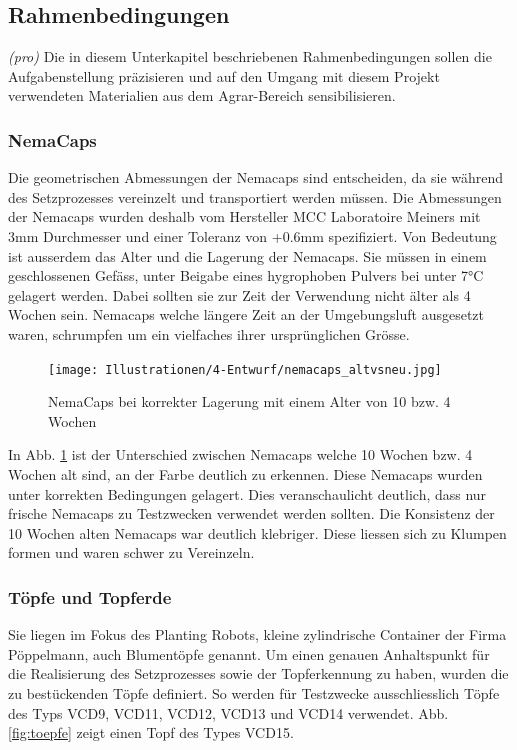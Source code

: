 \subsection{Rahmenbedingungen}
\textit{(pro)} Die in diesem Unterkapitel beschriebenen Rahmenbedingungen sollen die Aufgabenstellung präzisieren und auf den Umgang mit diesem Projekt verwendeten Materialien aus dem Agrar-Bereich sensibilisieren.

\subsubsection{NemaCaps}
Die geometrischen Abmessungen der Nemacaps sind entscheiden, da sie während des Setzprozesses vereinzelt und transportiert werden müssen. Die Abmessungen der Nemacaps wurden deshalb vom Hersteller MCC Laboratoire Meiners mit 3mm Durchmesser und einer Toleranz von +0.6mm spezifiziert. Von Bedeutung ist ausserdem das Alter und die Lagerung der Nemacaps. Sie müssen in einem geschlossenen Gefäss, unter Beigabe eines hygrophoben Pulvers bei unter 7°C gelagert werden. Dabei sollten sie zur Zeit der Verwendung nicht älter als 4 Wochen sein. Nemacaps welche längere Zeit an der Umgebungsluft ausgesetzt waren, schrumpfen um ein vielfaches ihrer ursprünglichen Grösse.

\begin{figure}[H]
	\texttt{[image: Illustrationen/4-Entwurf/nemacaps\_altvsneu.jpg]}
	\caption{NemaCaps bei korrekter Lagerung mit einem Alter von 10 bzw. 4 Wochen}
	\label{fig:nemacaps_altvsneu}
\end{figure}

In Abb. \ref{fig:nemacaps_altvsneu} ist der Unterschied zwischen Nemacaps welche 10 Wochen bzw. 4 Wochen alt sind, an der Farbe deutlich zu erkennen. Diese Nemacaps wurden unter korrekten Bedingungen gelagert. Dies veranschaulicht deutlich, dass nur frische Nemacaps zu Testzwecken verwendet werden sollten. Die Konsistenz der 10 Wochen alten Nemacaps war deutlich klebriger. Diese liessen sich zu Klumpen formen und waren schwer zu Vereinzeln.

\subsubsection{Töpfe und Topferde}
Sie liegen im Fokus des Planting Robots, kleine zylindrische Container der Firma Pöppelmann, auch Blumentöpfe genannt. Um einen genauen Anhaltspunkt für die Realisierung des Setzprozesses sowie der Topferkennung zu haben, wurden die zu bestückenden Töpfe definiert. So werden für Testzwecke ausschliesslich Töpfe des Typs VCD9, VCD11, VCD12, VCD13 und VCD14 verwendet. Abb. \ref{fig:toepfe} zeigt einen Topf des Types VCD15.

